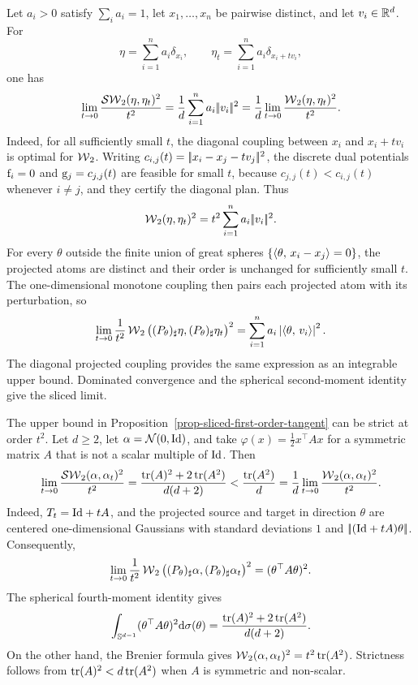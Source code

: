\begin{rem}\label{rem-sliced-local-atomic-equality}
	Let $a_i>0$ satisfy $\sum_i a_i=1$, let $x_1,\ldots,x_n$ be pairwise distinct, and let $v_i\in\mathbb{R}^d$. For
	\[
		\eta=\sum_{i=1}^n a_i\delta_{x_i},
		\qquad
		\eta_t=\sum_{i=1}^n a_i\delta_{x_i+t v_i},
	\]
	one has
	\[
		\lim_{t\to0}\frac{\operatorname{\mathcal{SW}}_2(\eta,\eta_t)^2}{t^2}
		=
		\frac1d\sum_{i=1}^n a_i|\!| v_i |\!|^2
		=
		\frac1d\lim_{t\to0}\frac{\operatorname{\mathcal{W}}_2(\eta,\eta_t)^2}{t^2}.
	\]
	Indeed, for all sufficiently small $t$, the diagonal coupling between $x_i$ and $x_i+t v_i$ is optimal for $\operatorname{\mathcal{W}}_2$. Writing $c_{i,j}(t)=|\!| x_i-x_j-tv_j |\!|^2$, the discrete dual potentials $\mathrm{f}_i=0$ and $\mathrm{g}_j=c_{j,j}(t)$ are feasible for small $t$, because $c_{j,j}(t)<c_{i,j}(t)$ whenever $i\neq j$, and they certify the diagonal plan. Thus
	\[
		\operatorname{\mathcal{W}}_2(\eta,\eta_t)^2
		=t^2\sum_{i=1}^n a_i|\!| v_i |\!|^2.
	\]
	For every $\theta$ outside the finite union of great spheres $\{\langle \theta,\,x_i-x_j\rangle=0\}$, the projected atoms are distinct and their order is unchanged for sufficiently small $t$. The one-dimensional monotone coupling then pairs each projected atom with its perturbation, so
	\[
		\lim_{t\to0}\frac{1}{t^2}
		\operatorname{\mathcal{W}}_2\big((P_\theta)_\sharp\eta,(P_\theta)_\sharp\eta_t\big)^2
		=
		\sum_{i=1}^n a_i\left\lvert\langle \theta,\,v_i\rangle\right\rvert^2.
	\]
	The diagonal projected coupling provides the same expression as an integrable upper bound. Dominated convergence and the spherical second-moment identity give the sliced limit.
\end{rem}

\begin{rem}\label{rem-sliced-local-gaussian-strict}
	The upper bound in Proposition~\ref{prop-sliced-first-order-tangent} can be strict at order $t^2$. Let $d\geq2$, let $\alpha=\mathcal{N}(0,\mathrm{Id})$, and take $\varphi(x)=\frac12x^\top A x$ for a symmetric matrix $A$ that is not a scalar multiple of $\mathrm{Id}$. Then
	\[
		\lim_{t\to0}\frac{\operatorname{\mathcal{SW}}_2(\alpha,\alpha_t)^2}{t^2}
		=
		\frac{\operatorname{tr}(A)^2+2\operatorname{tr}(A^2)}{d(d+2)}
		<
		\frac{\operatorname{tr}(A^2)}{d}
		=
		\frac1d\lim_{t\to0}\frac{\operatorname{\mathcal{W}}_2(\alpha,\alpha_t)^2}{t^2}.
	\]
	Indeed, $T_t=\mathrm{Id}+tA$, and the projected source and target in direction $\theta$ are centered one-dimensional Gaussians with standard deviations $1$ and $|\!| (\mathrm{Id}+tA)\theta |\!|$. Consequently,
	\[
		\lim_{t\to0}\frac{1}{t^2}
		\operatorname{\mathcal{W}}_2\big((P_\theta)_\sharp\alpha,(P_\theta)_\sharp\alpha_t\big)^2
		=
		(\theta^\top A\theta)^2.
	\]
	The spherical fourth-moment identity gives
	\[
		\int_{\mathbb{S}^{d-1}}(\theta^\top A\theta)^2\mathrm{d}\sigma(\theta)
		=
		\frac{\operatorname{tr}(A)^2+2\operatorname{tr}(A^2)}{d(d+2)}.
	\]
	On the other hand, the Brenier formula gives $\operatorname{\mathcal{W}}_2(\alpha,\alpha_t)^2=t^2\operatorname{tr}(A^2)$. Strictness follows from $\operatorname{tr}(A)^2<d\operatorname{tr}(A^2)$ when $A$ is symmetric and non-scalar.
\end{rem}

